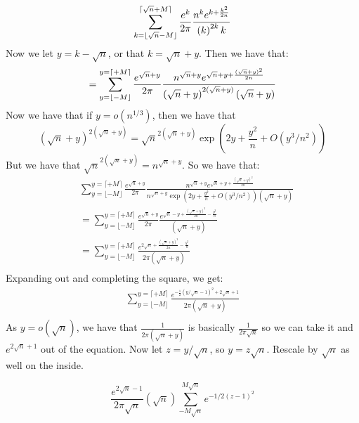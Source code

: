 \documentclass[]{article}
\begin{document}
\begin{equation*}
	\sum_{k = \lfloor \sqrt{n} - M \rfloor }^{ \lceil \sqrt{n} + M \rceil}
	\frac{e^{k}}{2\pi}
	\frac{n^{k} e^{k + \frac{k^2}{2n}}}
	{ \left(k\right)^{2k}k }\\
\end{equation*}
Now we let $y = k - \sqrt{n}$, or that $k = \sqrt{n} + y$. Then we have that:
\begin{equation*}
	=
	\sum_{y = \lfloor -M \rfloor }^{y =  \lceil + M \rceil}
	\frac{e^{\sqrt{n} + y}}{2\pi}
	\frac{n^{\sqrt{n} + y} e^{\sqrt{n} + y + \frac{(\sqrt{n} + y)^2}{2n}}}
	{ \left(\sqrt{n} + y\right)^{2(\sqrt{n} + y)}(\sqrt{n} + y) }\\
\end{equation*}
Now we have that if $y = o(n^{1/3})$, then we have that
\begin{equation}
	 \left(\sqrt{n} + y\right)^{2(\sqrt{n} + y)} = \sqrt{n}^{2 (\sqrt{n} + y)} \exp(2y + \frac{y^2}{n} + O(y^3/n^2))
\end{equation}
But we have that $\sqrt{n}^{2 (\sqrt{n} + y)}  = n^{\sqrt{n} + y}$. So we have that:
\begin{align*}
	&\sum_{y = \lfloor -M \rfloor }^{y =  \lceil + M \rceil}
	\frac{e^{\sqrt{n} + y}}{2\pi}
	\frac{n^{\sqrt{n} + y} e^{\sqrt{n} + y + \frac{(\sqrt{n} + y)^2}{2n}}}
	{ n^{\sqrt{n} + y}\exp(2y + \frac{y^2}{n} + O(y^3/n^2)) (\sqrt{n} + y) }\\
	&=
	\sum_{y = \lfloor -M \rfloor }^{y =  \lceil + M \rceil}
	\frac{e^{\sqrt{n} + y}}{2\pi}
	\frac{ e^{\sqrt{n} - y + \frac{(\sqrt{n} + y)^2}{2n} - \frac{y^2}{n}}}
	{(\sqrt{n} + y) }\\
	&=
	\sum_{y = \lfloor -M \rfloor }^{y =  \lceil + M \rceil}
	\frac{ e^{2\sqrt{n} + \frac{(\sqrt{n} + y)^2}{2n} - \frac{y^2}{n}}}
	{2 \pi(\sqrt{n} + y) }\\
\end{align*}
Expanding out and completing the square, we get:
\begin{align*}
		\sum_{y = \lfloor -M \rfloor }^{y =  \lceil + M \rceil}
	\frac{ e^{ - \frac{1}{2} (y/\sqrt{n} - 1)^2 + 2 \sqrt{n} +1 }}
	{2 \pi(\sqrt{n} + y) }\\
\end{align*}
As $y = o(\sqrt{n})$, we have that $\frac{1}{2 \pi(\sqrt{n} + y) }$ is basically $\frac{1}{2 \pi \sqrt{n}}$ so we can take it and $e^{2 \sqrt{n} + 1}$ out of the equation. Now let $z = y/\sqrt{n}$, so $y =z \sqrt{n}$. Rescale by $\sqrt{n}$ as well on the inside. 

\begin{equation}
	\frac{e^{2\sqrt{n} - 1}}{2 \pi \sqrt{n}} (\sqrt{n})\sum_{- M \sqrt{n}}^{M \sqrt{n}} e^{-1/2 (z - 1)^2}
\end{equation}
\end{document}
